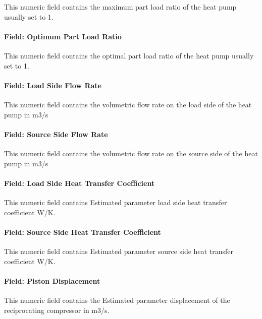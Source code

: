 This numeric field contains the maximum part load ratio of the heat pump usually set to 1.

\paragraph{Field: Optimum Part Load Ratio}\label{field-optimum-part-load-ratio-12}

This numeric field contains the optimal part load ratio of the heat pump usually set to 1.

\paragraph{Field: Load Side Flow Rate}\label{field-load-side-flow-rate-1}

This numeric field contains the volumetric flow rate on the load side of the heat pump in m3/s

\paragraph{Field: Source Side Flow Rate}\label{field-source-side-flow-rate-1}

This numeric field contains the volumetric flow rate on the source side of the heat pump in m3/s

\paragraph{Field: Load Side Heat Transfer Coefficient}\label{field-load-side-heat-transfer-coefficient-1}

This numeric field contains Estimated parameter load side heat transfer coefficient W/K.

\paragraph{Field: Source Side Heat Transfer Coefficient}\label{field-source-side-heat-transfer-coefficient-1-000}

This numeric field contains Estimated parameter source side heat transfer coefficient W/K.

\paragraph{Field: Piston Displacement}\label{field-piston-displacement-1}

This numeric field contains the Estimated parameter displacement of the reciprocating compressor in m3/s.

